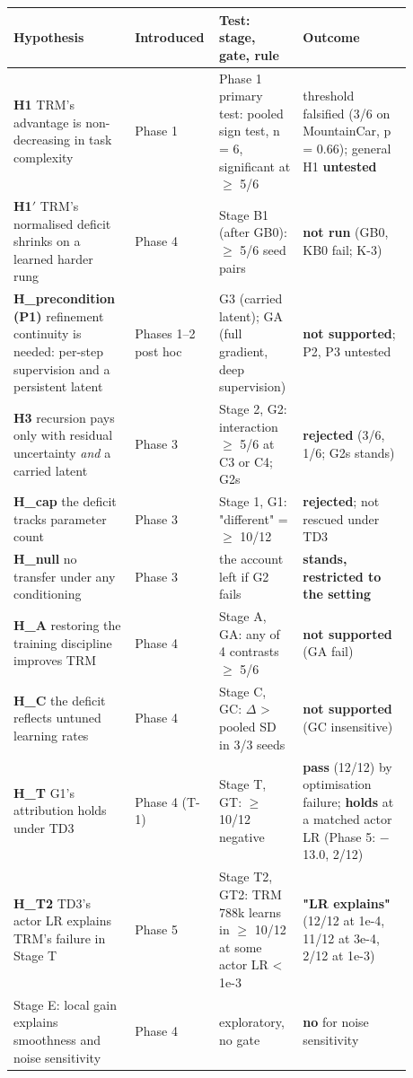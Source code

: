 \documentclass[11pt]{article}
\begin{document}
\begin{center}\small\begin{tabular}{>{\raggedright\arraybackslash}p{0.293\linewidth}>{\raggedright\arraybackslash}p{0.115\linewidth}>{\raggedright\arraybackslash}p{0.206\linewidth}>{\raggedright\arraybackslash}p{0.264\linewidth}}
\toprule
Hypothesis & Introduced & Test: stage, gate, rule & Outcome \\
\midrule
\textbf{H1} TRM's advantage is non-decreasing in task complexity & Phase 1 & Phase 1 primary test: pooled sign test, n = 6, significant at $\geq$ 5/6 & threshold falsified (3/6 on MountainCar, p = 0.66); general H1 \textbf{untested} \\
\textbf{H1$'$} TRM's normalised deficit shrinks on a learned harder rung & Phase 4 & Stage B1 (after GB0): $\geq$ 5/6 seed pairs & \textbf{not run} (GB0, KB0 fail; K-3) \\
\textbf{H\_precondition (P1)} refinement continuity is needed: per-step supervision and a persistent latent & Phases 1--2 post hoc & G3 (carried latent); GA (full gradient, deep supervision) & \textbf{not supported}; P2, P3 untested \\
\textbf{H3} recursion pays only with residual uncertainty \emph{and} a carried latent & Phase 3 & Stage 2, G2: interaction $\geq$ 5/6 at C3 or C4; G2s & \textbf{rejected} (3/6, 1/6; G2s stands) \\
\textbf{H\_cap} the deficit tracks parameter count & Phase 3 & Stage 1, G1: "different" = $\geq$ 10/12 & \textbf{rejected}; not rescued under TD3 \\
\textbf{H\_null} no transfer under any conditioning & Phase 3 & the account left if G2 fails & \textbf{stands, restricted to the setting} \\
\textbf{H\_A} restoring the training discipline improves TRM & Phase 4 & Stage A, GA: any of 4 contrasts $\geq$ 5/6 & \textbf{not supported} (GA fail) \\
\textbf{H\_C} the deficit reflects untuned learning rates & Phase 4 & Stage C, GC: $\Delta$ > pooled SD in 3/3 seeds & \textbf{not supported} (GC insensitive) \\
\textbf{H\_T} G1's attribution holds under TD3 & Phase 4 (T-1) & Stage T, GT: $\geq$ 10/12 negative & \textbf{pass} (12/12) by optimisation failure; \textbf{holds} at a matched actor LR (Phase 5: $-$13.0, 2/12) \\
\textbf{H\_T2} TD3's actor LR explains TRM's failure in Stage T & Phase 5 & Stage T2, GT2: TRM 788k learns in $\geq$ 10/12 at some actor LR < 1e-3 & \textbf{"LR explains"} (12/12 at 1e-4, 11/12 at 3e-4, 2/12 at 1e-3) \\
Stage E: local gain explains smoothness and noise sensitivity & Phase 4 & exploratory, no gate & \textbf{no} for noise sensitivity \\
\bottomrule
\end{tabular}\end{center}
\end{document}
